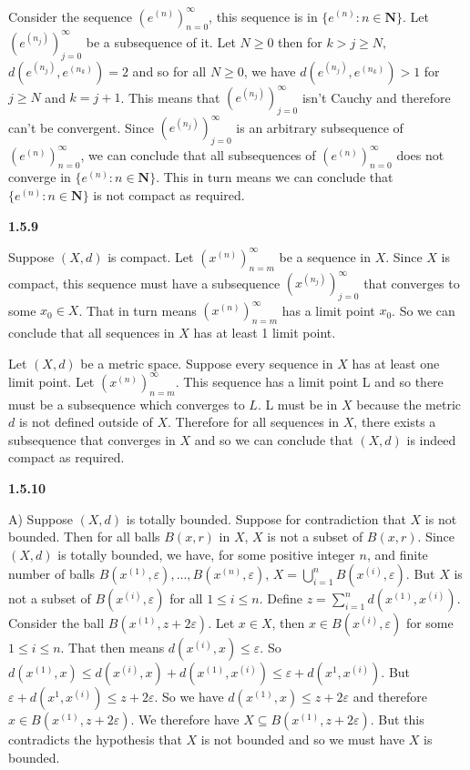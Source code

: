 \documentclass[12pt]{article}
\begin{document}
Consider the sequence $(e^{(n)})^\infty_{n=0}$, this sequence is in $\{e^{(n)}:n\in \textbf{N}\}$. Let $(e^{(n_j)})^\infty_{j=0}$ be a subsequence of it. Let $N\geq 0$ then for $k> j\geq N,$ $d(e^{(n_j)},e^{(n_k)} ) = 2$ and so for all $N\geq 0$, we have $d(e^{(n_j)},e^{(n_k)} )>1$ for $j\geq N$ and $k=j+1$. This means that $(e^{(n_j)})^\infty_{j=0}$ isn't Cauchy and therefore can't be convergent. Since $(e^{(n_j)})^\infty_{j=0}$ is an arbitrary subsequence of $(e^{(n)})^\infty_{n=0}$, we can conclude that all subsequences of $(e^{(n)})^\infty_{n=0}$ does not converge in $\{e^{(n)}:n\in \textbf{N}\}$. This in turn means we can conclude that $\{e^{(n)}:n\in \textbf{N}\}$ is not compact as required. 

\textbf{1.5.9}

Suppose $(X,d)$ is compact. Let $(x^{(n)})^\infty_{n=m}$ be a sequence in $X$. Since $X$ is compact, this sequence must have a subsequence $(x^{(n_j)})^\infty_{j=0}$ that converges to some $x_0\in X$. That in turn means $(x^{(n)})^\infty_{n=m}$ has a limit point $x_0$. So we can conclude that all sequences in $X$ has at least 1 limit point. 

Let $(X,d)$ be a metric space. Suppose every sequence in $X$ has at least one limit point. Let $(x^{(n)})^\infty_{n=m}$. This sequence has a limit point L and so there must be a subsequence which converges to $L$. L must be in $X$ because the metric $d$ is not defined outside of $X$. Therefore for all sequences in $X$, there exists a subsequence that converges in $X$ and so we can conclude that $(X,d)$ is indeed compact as required. 

\textbf{1.5.10}

A) Suppose $(X,d)$ is totally bounded. Suppose for contradiction that $X$ is not bounded. Then for all balls $B(x,r)$ in $X$, $X$ is not a subset of $B(x,r)$. Since $(X,d)$ is totally bounded, we have, for some positive integer $n$, and finite number of balls $B(x^{(1)},\varepsilon),..., B(x^{(n)},\varepsilon)$, $X = \bigcup^n_{i=1}B(x^{(i)},\varepsilon)$. But $X$ is not a subset of $B(x^{(i)},\varepsilon)$ for all $1\leq i \leq n$. Define $ z= \sum_{i=1}^nd(x^{(1)}, x^{(i)})$. Consider the ball $B(x^{(1)},z+2\varepsilon)$. Let $x\in X$, then $x\in B(x^{(i)},\varepsilon) $ for some $ 1\leq i \leq n$. That then means $d(x^{(i)}, x) \leq \varepsilon$. So $d(x^{(1)}, x)\leq d(x^{(i)}, x) + d(x^{(1)},x^{(i)})\leq \varepsilon +d(x^{1},x^{(i)})$. But $\varepsilon +d(x^{1},x^{(i)})\leq z + 2\varepsilon$. So we have $d(x^{(1)},x )\leq z + 2\varepsilon$ and therefore $x\in B(x^{(1)},z+2\varepsilon)$. We therefore have $X\subseteq B(x^{(1)},z+2\varepsilon)$. But this contradicts the hypothesis that $X$ is not bounded and so we must have $X$ is bounded.
\end{document}
